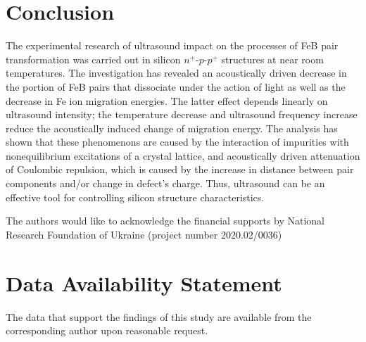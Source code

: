 \documentclass[%
 aip,jap,
 amsmath,amssymb,
 reprint,%
]{revtex4-1}
\begin{document}
\section{Conclusion}
The experimental research of ultrasound impact on the processes of FeB pair transformation was carried out in silicon $n^+$-$p$-$p^+$ structures at near room temperatures.
The investigation has revealed an acoustically driven decrease in the portion of FeB pairs that dissociate under the action of light as well as the decrease in Fe ion migration energies.
The latter effect depends linearly on ultrasound intensity;
the temperature decrease and ultrasound frequency increase reduce the acoustically induced change of migration energy.
The analysis has shown that these phenomenons are caused by the interaction of impurities with nonequilibrium excitations of a crystal lattice,  and acoustically driven attenuation of Coulombic repulsion, which is caused by the increase in distance between pair components and/or change in defect's charge.
Thus, ultrasound can be an effective  tool for controlling silicon structure characteristics.



\begin{acknowledgments}
The authors would like to acknowledge the financial supports by National Research Foundation  of Ukraine
(project number 2020.02/0036)
\end{acknowledgments}

\section*{Data Availability Statement}

The data that support the findings of this study are available from the corresponding author upon reasonable request.
\end{document}
